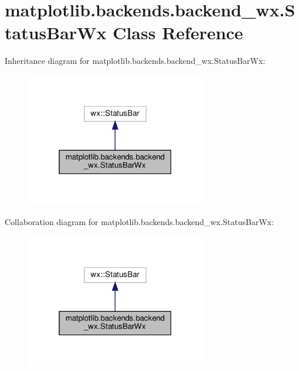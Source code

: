 \hypertarget{classmatplotlib_1_1backends_1_1backend__wx_1_1StatusBarWx}{}\section{matplotlib.\+backends.\+backend\+\_\+wx.\+Status\+Bar\+Wx Class Reference}
\label{classmatplotlib_1_1backends_1_1backend__wx_1_1StatusBarWx}


Inheritance diagram for matplotlib.\+backends.\+backend\+\_\+wx.\+Status\+Bar\+Wx\+:
\nopagebreak
\begin{figure}[H]
\begin{center}
\leavevmode
\includegraphics[width=223pt]{classmatplotlib_1_1backends_1_1backend__wx_1_1StatusBarWx__inherit__graph}
\end{center}
\end{figure}


Collaboration diagram for matplotlib.\+backends.\+backend\+\_\+wx.\+Status\+Bar\+Wx\+:
\nopagebreak
\begin{figure}[H]
\begin{center}
\leavevmode
\includegraphics[width=223pt]{classmatplotlib_1_1backends_1_1backend__wx_1_1StatusBarWx__coll__graph}
\end{center}
\end{figure}
